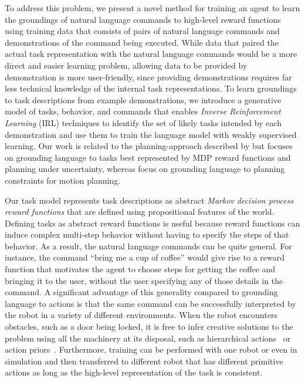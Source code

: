 \documentclass[conference]{IEEEtran}
\begin{document}
To address this problem, we present a novel method for training an
agent to learn the groundings of natural language commands to
high-level reward functions using training data that consists of pairs
of natural language commands and demonstrations of the command being
executed.  While data that paired the actual task representation with
the natural language commands would be a more direct and easier
learning problem, allowing data to be provided by demonstration is
more user-friendly, since providing demonstrations requires far less
technical knowledge of the internal task representations. To learn
groundings to task descriptions from example demonstrations, we
introduce a generative model of tasks, behavior, and commands that
enables {\em Inverse Reinforcement Learning} (IRL) \cite{ng00}
techniques to identify the set of likely tasks intended by each
demonstration and use them to train the language model with weakly
supervised learning.  Our work is related to the planning-approach
described by \citet{howard14} but focuses on grounding language to
tasks best represented by MDP reward functions and planning under
uncertainty, whereas \citet{howard14} focus on grounding language to
planning constraints for motion planning.



Our task model represents task descriptions as abstract \emph{Markov
  decision process reward functions} that are defined using
propositional features of the world. Defining tasks as abstract reward
functions is useful because reward functions can induce complex
multi-step behavior without having to specify the steps of that
behavior. As a result, the natural language commands can be quite
general. For instance, the command ``bring me a cup of coffee'' would
give rise to a reward function that motivates the agent to choose
steps for getting the coffee and bringing it to the user, without the
user specifying any of those details in the command. A significant
advantage of this generality compared to grounding language to actions
is that the same command can be successfully interpreted by the robot
in a variety of different environments.  When the robot encounters
obstacles, such as a door being locked, it is free to infer creative
solutions to the problem using all the machinery at its disposal, such
as hierarchical actions~\citep{sutton99} or action
priors~\citep{abel14}. Furthermore, training can be
performed with one robot or even in simulation and then transferred to
different robot that has different primitive actions as long as the
high-level representation of the task is consistent.
\end{document}
